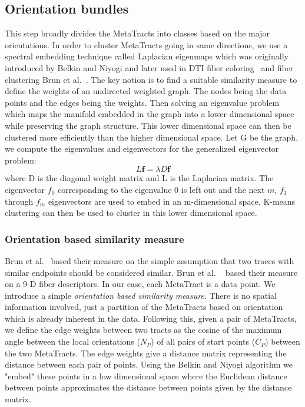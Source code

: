 \subsection {Orientation bundles}

This step broadly divides the MetaTracts into classes based on the major orientations.
In order to cluster MetaTracts going in same directions, we use a spectral embedding technique called Laplacian eigenmaps which was originally introduced by Belkin and Niyogi \cite{Belkin01} and later used in DTI fiber coloring~\cite{Brun2003} and fiber clustering Brun et al.~\cite{Brun2004}. The key notion is to find a suitable similarity measure to define the weights of an undirected weighted graph. The nodes being the data points and the edges being the weights. Then solving an eigenvalue problem which maps the manifold embedded in the graph into a lower dimensional space while preserving the graph structure.
This lower dimensional space can then be clustered more efficiently than the higher dimensional space. 
Let G be the graph, we compute the eigenvalues and eigenvectors for the generalized eigenvector problem:
\begin{equation}\label{equn:eigenMaps}
L\textbf{f}=\lambda D\textbf{f}
\end{equation}
where D is the diagonal weight matrix and L is the Laplacian matrix. The eigenvector \textbf{${f}_{0}$} corresponding to the eigenvalue 0 is left out and the next $m$, {\textbf{${f}_{1}$} through \textbf{${f}_{m}$}} eigenvectors are used to embed in an m-dimensional space. K-means clustering can then be used to cluster in this lower dimensional space.


\subsubsection{Orientation based similarity measure}
\label{subsec:ori-sim-mes}
Brun et al.~\cite{Brun2003} based their measure on the simple assumption that two traces with similar endpoints should 
be considered similar. Brun et al. ~\cite{Brun2004} based their measure on a 9-D fiber descriptors.
In our case, each MetaTract is a data point. We introduce a simple \textit{orientation based similarity measure}. There is no spatial information involved, just a partition of the MetaTracts based on orientation which is already inherent in the data.
Following this, given a pair of  MetaTracts, we define the edge weights between two tracts as the cosine of the maximum angle between the local orientations ($N_P$) of all pairs of start points ($C_P$) between the two MetaTracts.
The edge weights give a distance matrix representing the distance between each pair of points.
Using the Belkin and Niyogi algorithm we "embed" these points in a low dimensional space where the Euclidean distance between points approximates the distance between points given by the distance matrix.

